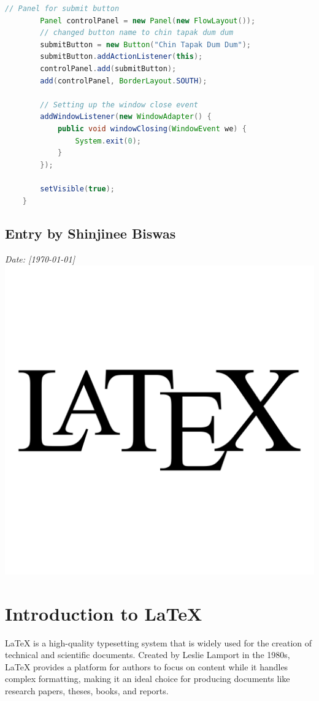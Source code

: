 \documentclass[12pt, a4paper]{article}
\begin{document}
\begin{lstlisting}[language=Java, caption=Java Swing Application Code]
        // Panel for submit button
        Panel controlPanel = new Panel(new FlowLayout());
        // changed button name to chin tapak dum dum
        submitButton = new Button("Chin Tapak Dum Dum"); 
        submitButton.addActionListener(this);
        controlPanel.add(submitButton);
        add(controlPanel, BorderLayout.SOUTH);

        // Setting up the window close event
        addWindowListener(new WindowAdapter() {
            public void windowClosing(WindowEvent we) {
                System.exit(0);
            }
        });

        setVisible(true);
    }
\end{lstlisting}


\newpage
{}
\vspace{-2cm}
\subsection*{Entry by Shinjinee Biswas}
\textit{Date: [\today]}\\
\centering
    \includegraphics[width=0.3\linewidth]{Latex.png}
\section*{\textcolor{blue!60}{\Huge Introduction to LaTeX}}
\vspace{1.5cm}
LaTeX is a high-quality typesetting system that is widely used for the creation of technical and scientific documents. Created by Leslie Lamport in the 1980s, LaTeX provides a platform for authors to focus on content while it handles complex formatting, making it an ideal choice for producing documents like research papers, theses, books, and reports.

\vspace{1.7cm}
\end{document}
